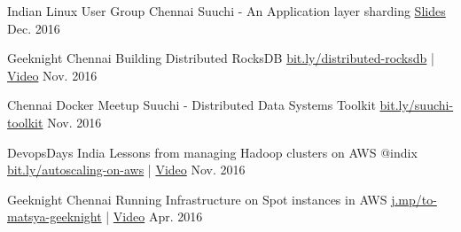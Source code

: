 

\begin{cventries}

  \cventry
    {Indian Linux User Group Chennai} %
    {Suuchi - An Application layer sharding} %
    {\href{https://speakerdeck.com/ashwanthkumar/suuchi-application-layer-sharding}{Slides}} %
    {Dec. 2016} %
    {
    }

  \cventry
    {Geeknight Chennai} %
    {Building Distributed RocksDB} %
    {\href{http://bit.ly/distributed-rocksdb}{bit.ly/distributed-rocksdb} | \href{https://www.youtube.com/watch?v=PSCa9_Avne0}{Video}} %
    {Nov. 2016} %
    {
    }

  \cventry
    {Chennai Docker Meetup} %
    {Suuchi - Distributed Data Systems Toolkit} %
    {\href{http://bit.ly/suuchi-toolkit}{bit.ly/suuchi-toolkit}} %
    {Nov. 2016} %
    {
    }

  \cventry
    {DevopsDays India} %
    {Lessons from managing Hadoop clusters on AWS @indix} %
    {\href{http://bit.ly/autoscaling-on-aws}{bit.ly/autoscaling-on-aws} | \href{https://www.youtube.com/watch?v=eBbgylpRufQ}{Video}} %
    {Nov. 2016} %
    {
    }

  \cventry
    {Geeknight Chennai} %
    {Running Infrastructure on Spot instances in AWS} %
    {\href{http://j.mp/to-matsya-geeknight}{j.mp/to-matsya-geeknight} | \href{https://www.youtube.com/watch?v=qeBV9JRoTOA}{Video}} %
    {Apr. 2016} %
    {
    }

\end{cventries}
